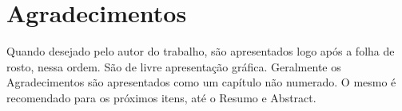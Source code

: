 \chapter*{Agradecimentos}
Quando desejado pelo autor do trabalho, são apresentados logo após a folha de
rosto, nessa ordem.
São de livre apresentação gráfica.
Geralmente os Agradecimentos são apresentados como um capítulo não numerado.
O mesmo é recomendado para os próximos itens, até o Resumo e Abstract.